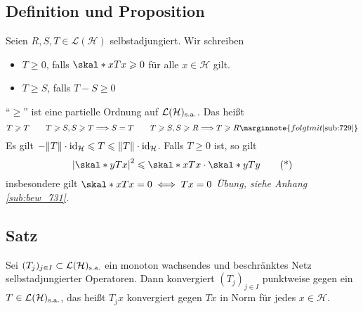 \subsection[Definition und Proposition: Partielle Ordnung auf den selbstadjungierten Operatoren]{Definition und Proposition} %
\label{sub:731}
Seien $R,S,T \in \mathcal{L}(\mathcal{H})$ selbstadjungiert. Wir schreiben 
\begin{itemize}
	\item $T \ge 0$, falls $\skal*{x}{T x} \ge 0$ für alle $x \in \mathcal{H}$ gilt.
	\item $T \ge S$, falls $T-S \ge 0$
\end{itemize}
\enquote{$\ge$} ist eine partielle Ordnung auf $\mathcal{L}(\mathcal{H})_\sa$. Das heißt 
\[
	T \ge T \qquad T \ge S, S \ge T \Longrightarrow S=T \qquad T \ge S, S \ge R \Longrightarrow T \ge R\marginnote{folgt mit \ref{sub:729}}
\]
Es gilt $-\norm{T} \cdot \id_{\mathcal{H}} \le T  \le \norm{T} \cdot \id_{\mathcal{H}}$. Falls $T \ge 0$ ist, so gilt 
\begin{equation*}
	\abs*{\skal*{y}{T x}}^2 \le  \skal*{x}{T x} \cdot \skal*{y}{T y} \label{eq:731} \tag{*}
\end{equation*}
insbesondere gilt $\skal*{x}{T x}=0 \iff T x=0$
\emph{Übung, siehe Anhang \ref{sub:bew_731}.}\bewende

\subsection[Satz: Konvergenz eines monoton wachsenden, beschränkten Netzes in $\mathcal{L}(\mathcal{H})_\sa$]{Satz} %
\label{sub:732}
Sei $(T_j)_{j \in I} \subset \mathcal{L}(\mathcal{H})_{\mathrm{s.a.}}$ ein monoton wachsendes und beschränktes Netz selbstadjungierter Operatoren. Dann konvergiert $(T_j)_{j \in I}$
punktweise gegen ein $T \in \mathcal{L}(\mathcal{H})_{\mathrm{s.a.}}$, das heißt $T_j x$ konvergiert gegen $T x$ in Norm für jedes $x \in \mathcal{H}$. 

